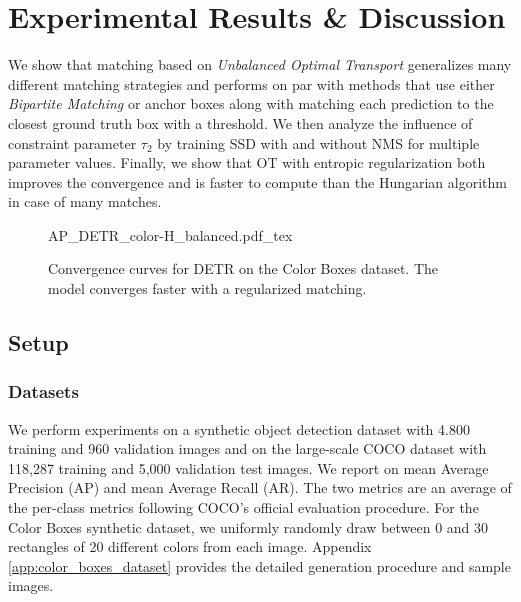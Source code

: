 \section{Experimental Results \& Discussion}

We show that matching based on \textit{Unbalanced Optimal Transport} generalizes many different matching strategies and performs on par with methods that use either \textit{Bipartite Matching} or anchor boxes along with matching each prediction to the closest ground truth box with a threshold. We then analyze the influence of constraint parameter $\tau_2$ by training SSD with and without NMS for multiple parameter values. Finally, we show that OT with entropic regularization both improves the convergence and is faster to compute than the Hungarian algorithm in case of many matches.

\begin{figure}
    \centering
    \def\svgwidth{0.8\textwidth}\small
    \graphicspath{{chapters/uotod/image/}}
    {AP_DETR_color-H_balanced.pdf_tex}
    \caption{Convergence curves for DETR on the Color Boxes dataset. The model converges faster with a regularized matching.}
    \label{fig:DETRmAPtoy}
\end{figure}

\subsection{Setup}
\subsubsection{Datasets} We perform experiments on a synthetic object detection dataset with 4.800 training and 960 validation images and on the large-scale COCO \cite{lin2014microsoft} dataset with 118,287 training and 5,000 validation test images. We report on mean Average Precision (AP) and mean Average Recall (AR). The two metrics are an average of the per-class metrics following COCO's official evaluation procedure. For the Color Boxes synthetic dataset, we uniformly randomly draw between 0 and 30 rectangles of 20 different colors from each image. Appendix \ref{app:color_boxes_dataset} provides the detailed generation procedure and sample images.


